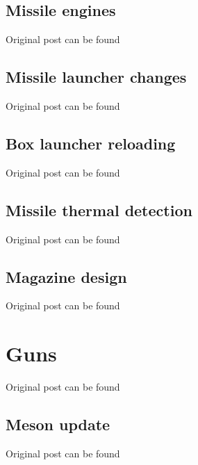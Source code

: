 \documentclass[10pt,a4paper,oneside]{article}
\begin{document}
\subsection{Missile engines}
Original post can be found

\subsection{Missile launcher changes}
Original post can be found

\subsection{Box launcher reloading}
Original post can be found

\subsection{Missile thermal detection}
Original post can be found

\subsection{Magazine design}
Original post can be found


\section{Guns}
Original post can be found

\subsection{Meson update}
Original post can be found

\end{document}
